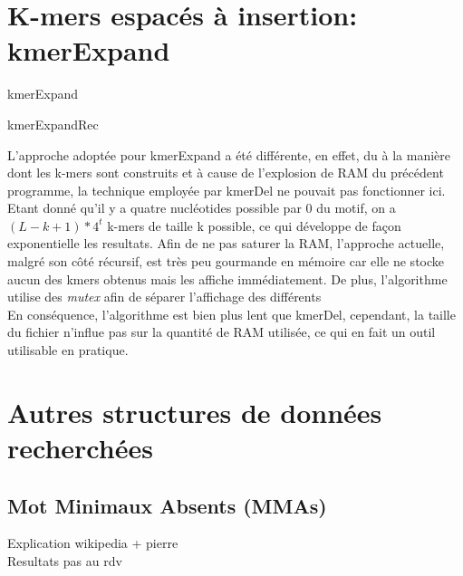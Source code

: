 \documentclass{report}
\begin{document}
  \chapter{K-mers espacés à insertion: kmerExpand}
    \normalsize
    \begin{algorithm}[H]{
      \caption{kmerExpand}
    }\end{algorithm}
    \begin{algorithm}[H]{
      \caption{kmerExpandRec}
    }\end{algorithm}
    \large
    L'approche adoptée pour kmerExpand a été différente, en effet, du à la manière dont les k-mers sont construits et à cause de l'explosion de RAM du précédent programme, la technique employée par kmerDel ne pouvait pas fonctionner ici.\\
    Etant donné qu'il y a quatre nucléotides possible par $0$ du motif, on a $(L - k + 1 )*4^t$ k-mers de taille k possible, ce qui développe de façon exponentielle les resultats. Afin de ne pas saturer la RAM, l'approche actuelle, malgré son côté récursif, est très peu gourmande en mémoire car elle ne stocke aucun des kmers obtenus mais les affiche immédiatement. De plus, l'algorithme utilise des \textit{mutex} afin de séparer l'affichage des différents \\
    En conséquence, l'algorithme est bien plus lent que kmerDel, cependant, la taille du fichier n'influe pas sur la quantité de RAM utilisée, ce qui en fait un outil utilisable en pratique.
    \newpage
  \chapter{Autres structures de données recherchées}
    \section{Mot Minimaux Absents (MMAs)}
      Explication wikipedia + pierre\\
      Resultats pas au rdv
\end{document}
